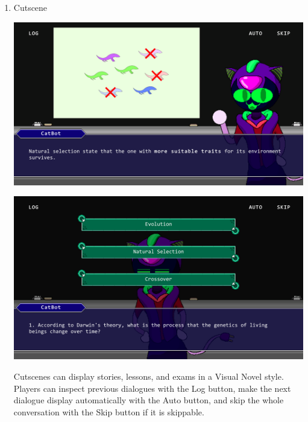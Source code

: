 \documentclass[12pt,oneside,openright,a4paper]{cpe-english-project}
\begin{document}
\begin{enumerate}
	\item Cutscene \\
	\begin{minipage}[c]{\textwidth}\centering
	\includegraphics[width=14cm]{figure/screenshot/screenshot-cutscene-dialogue.png}
	\end{minipage}
	\begin{minipage}[c]{\textwidth}\centering
	\includegraphics[width=14cm]{figure/screenshot/screenshot-cutscene-choice.png}
	\end{minipage}
	Cutscenes can display stories, lessons, and exams in a Visual Novel style. Players can inspect previous dialogues with the Log button, make the next dialogue display automatically with the Auto button, and skip the whole conversation with the Skip button if it is skippable.


\end{enumerate}
\end{document}
